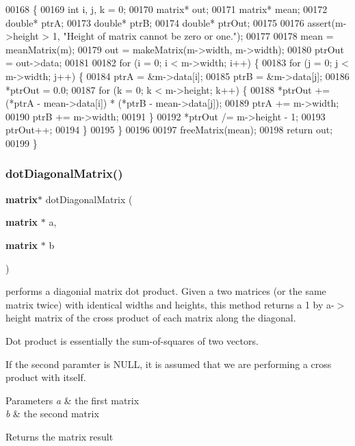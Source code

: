 \begin{DoxyCode}
00168                                     \{
00169     \textcolor{keywordtype}{int} i, j, k = 0;
00170     matrix* out;
00171     matrix* mean;
00172     \textcolor{keywordtype}{double}* ptrA;
00173     \textcolor{keywordtype}{double}* ptrB;
00174     \textcolor{keywordtype}{double}* ptrOut;
00175 
00176     assert(m->height > 1, \textcolor{stringliteral}{"Height of matrix cannot be zero or one."});
00177 
00178     mean = meanMatrix(m);
00179     out = makeMatrix(m->width, m->width);
00180     ptrOut = out->data;
00181 
00182     \textcolor{keywordflow}{for} (i = 0; i < m->width; i++) \{
00183         \textcolor{keywordflow}{for} (j = 0; j < m->width; j++) \{
00184              ptrA = &m->data[i];
00185              ptrB = &m->data[j];
00186              *ptrOut = 0.0;
00187              \textcolor{keywordflow}{for} (k = 0; k < m->height; k++) \{
00188                  *ptrOut += (*ptrA - mean->data[i]) * (*ptrB - mean->data[j]);
00189                  ptrA += m->width;
00190                  ptrB += m->width;
00191              \}
00192              *ptrOut /= m->height - 1;
00193              ptrOut++;
00194         \}
00195     \}
00196 
00197     freeMatrix(mean);
00198     \textcolor{keywordflow}{return} out;
00199 \}
\end{DoxyCode}
\mbox{\label{matrix_8h_af49b525d7476c365833db9acd975e3a5}} 
\subsubsection{dot\+Diagonal\+Matrix()}
{\footnotesize\ttfamily \textbf{ matrix}$\ast$ dot\+Diagonal\+Matrix (\begin{DoxyParamCaption}\item[{\textbf{ matrix} $\ast$}]{a,  }\item[{\textbf{ matrix} $\ast$}]{b }\end{DoxyParamCaption})}



performs a diagonial matrix dot product. Given a two matrices (or the same matrix twice) with identical widths and heights, this method returns a 1 by a-\/$>$height matrix of the cross product of each matrix along the diagonal. 

Dot product is essentially the sum-\/of-\/squares of two vectors.

If the second paramter is N\+U\+LL, it is assumed that we are performing a cross product with itself. 
\begin{DoxyParams}{Parameters}
{\em a} & the first matrix \\
\hline
{\em b} & the second matrix \\
\hline
\end{DoxyParams}
\begin{DoxyReturn}{Returns}
the matrix result 
\end{DoxyReturn}


